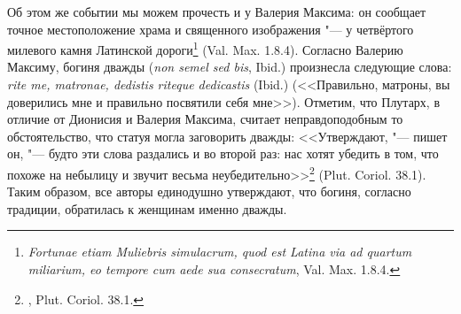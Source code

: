 



Об этом же событии мы можем прочесть и у Валерия Максима: он сообщает точное местоположение храма и священного изображения "--- у четвёртого милевого камня Латинской дороги\footnote{\textit{Fortunae etiam Muliebris simulacrum, quod est Latina via ad quartum miliarium, eo tempore cum aede sua consecratum}, Val. Max. 1.8.4.} (Val. Max. 1.8.4). Согласно Валерию Максиму, богиня дважды (\textit{non semel sed bis}, Ibid.) произнесла следующие слова: \textit{rite me, matronae, dedistis riteque dedicastis} (Ibid.) (<<Правильно, матроны, вы доверились мне и правильно посвятили себя мне>>). Отметим, что Плутарх, в отличие от Дионисия и Валерия Максима, считает неправдоподобным то обстоятельство, что статуя могла заговорить дважды: <<Утверждают, "--- пишет он, "--- будто эти слова раздались и во второй раз: нас хотят убедить в том, что похоже на небылицу и звучит весьма неубедительно>>\footnote{, Plut. Coriol. 38.1.} (Plut. Coriol. 38.1). Таким образом, все авторы единодушно утверждают, что богиня, согласно традиции, обратилась к женщинам именно дважды.

